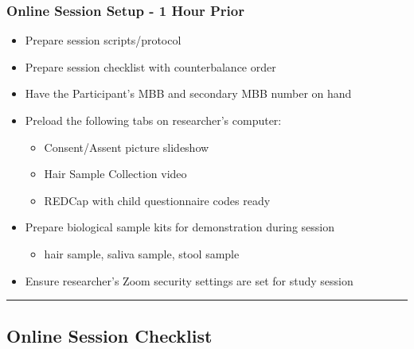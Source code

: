 \documentclass[]{book}
\providecommand{\tightlist}{%
  \setlength{\itemsep}{0pt}\setlength{\parskip}{0pt}}
\begin{document}
\hypertarget{online-session-setup---1-hour-prior}{%
\subsubsection{Online Session Setup - 1 Hour Prior}\label{online-session-setup---1-hour-prior}}

\begin{itemize}
\tightlist
\item
  Prepare session scripts/protocol
\item
  Prepare session checklist with counterbalance order
\item
  Have the Participant's MBB and secondary MBB number on hand
\item
  Preload the following tabs on researcher's computer:

  \begin{itemize}
  \tightlist
  \item
    Consent/Assent picture slideshow
  \item
    Hair Sample Collection video
  \item
    REDCap with child questionnaire codes ready
  \end{itemize}
\item
  Prepare biological sample kits for demonstration during session

  \begin{itemize}
  \tightlist
  \item
    hair sample, saliva sample, stool sample
  \end{itemize}
\item
  Ensure researcher's Zoom security settings are set for study session
\end{itemize}

\begin{center}\rule{0.5\linewidth}{0.5pt}\end{center}

\hypertarget{online-session-checklist}{%
\subsection{Online Session Checklist}\label{online-session-checklist}}
\end{document}

